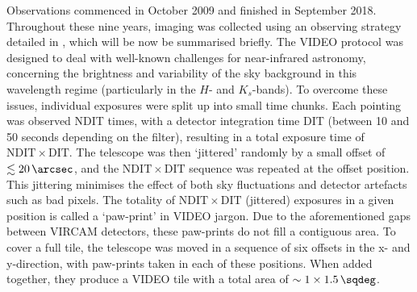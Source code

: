 Observations commenced in October 2009 and finished in September 2018. Throughout these nine years, imaging was collected using an observing strategy detailed in \cite{2013MNRAS.428.1281J}, which will be now be summarised  briefly. The VIDEO protocol was designed to deal with well-known challenges for near-infrared astronomy, concerning the brightness and variability of the sky background in this wavelength regime (particularly in the $H$- and $K_{s}$-bands). To overcome these issues, individual exposures were split up into small time chunks. Each pointing was observed NDIT times, with a detector integration time DIT (between 10 and 50 seconds depending on the filter), resulting in a total exposure time of $\mathrm{NDIT} \times \mathrm{DIT}$. The telescope was then `jittered' randomly by a small offset of $\lesssim\SI{20}{\arcsec}$, and the $\mathrm{NDIT} \times \mathrm{DIT}$ sequence was repeated at the offset position. This jittering minimises the effect of  both sky fluctuations and detector artefacts such as bad pixels. The totality of $\mathrm{NDIT} \times \mathrm{DIT}$ (jittered) exposures in a given position is called a `paw-print' in VIDEO jargon. Due to the aforementioned gaps between VIRCAM  detectors, these paw-prints do not fill a contiguous area. To cover a full tile, the telescope was moved in a sequence of six offsets in the x- and y-direction, with paw-prints taken in each of these positions. When added together, they produce a VIDEO tile with a total area of $\sim 1 \times \SI{1.5}{\sqdeg}$. \par 




